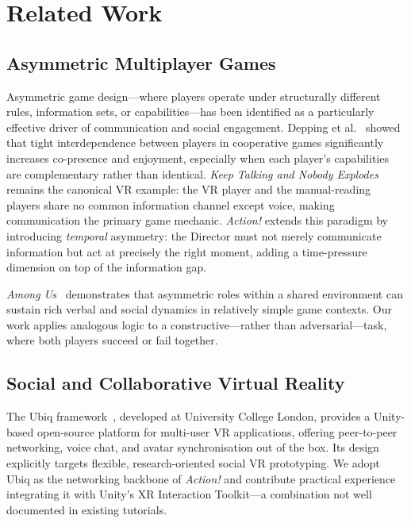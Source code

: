 \documentclass[12pt,a4paper]{article}
\begin{document}
\section{Related Work}
\label{sec:related}

\subsection{Asymmetric Multiplayer Games}

Asymmetric game design---where players operate under structurally different rules, information sets, or capabilities---has been identified as a particularly effective driver of communication and social engagement. Depping et al.~\cite{depping2016} showed that tight interdependence between players in cooperative games significantly increases co-presence and enjoyment, especially when each player's capabilities are complementary rather than identical. \textit{Keep Talking and Nobody Explodes}~\cite{keeptalking2015} remains the canonical VR example: the VR player and the manual-reading players share no common information channel except voice, making communication the primary game mechanic. \textit{Action!} extends this paradigm by introducing \emph{temporal} asymmetry: the Director must not merely communicate information but act at precisely the right moment, adding a time-pressure dimension on top of the information gap.

\textit{Among Us}~\cite{innersloth2018} demonstrates that asymmetric roles within a shared environment can sustain rich verbal and social dynamics in relatively simple game contexts. Our work applies analogous logic to a constructive---rather than adversarial---task, where both players succeed or fail together.

\subsection{Social and Collaborative Virtual Reality}

The Ubiq framework~\cite{friston2022}, developed at University College London, provides a Unity-based open-source platform for multi-user VR applications, offering peer-to-peer networking, voice chat, and avatar synchronisation out of the box. Its design explicitly targets flexible, research-oriented social VR prototyping. We adopt Ubiq as the networking backbone of \textit{Action!} and contribute practical experience integrating it with Unity's XR Interaction Toolkit---a combination not well documented in existing tutorials.
\end{document}
